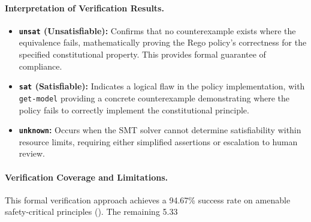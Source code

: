 \documentclass[manuscript,screen,9pt]{acmart}
\begin{document}
\paragraph{Interpretation of Verification Results.}
\begin{itemize}[leftmargin=*,itemsep=2pt,parsep=1pt]
    \item \textbf{\texttt{unsat} (Unsatisfiable):} Confirms that no counterexample exists where the equivalence fails, mathematically proving the Rego policy's correctness for the specified constitutional property. This provides formal guarantee of compliance.
    \item \textbf{\texttt{sat} (Satisfiable):} Indicates a logical flaw in the policy implementation, with \texttt{get-model} providing a concrete counterexample demonstrating where the policy fails to correctly implement the constitutional principle.
    \item \textbf{\texttt{unknown}:} Occurs when the SMT solver cannot determine satisfiability within resource limits, requiring either simplified assertions or escalation to human review.
\end{itemize}

\paragraph{Verification Coverage and Limitations.} This formal verification approach achieves a 94.67\% success rate on amenable safety-critical principles (). The remaining 5.33%

\end{document}
